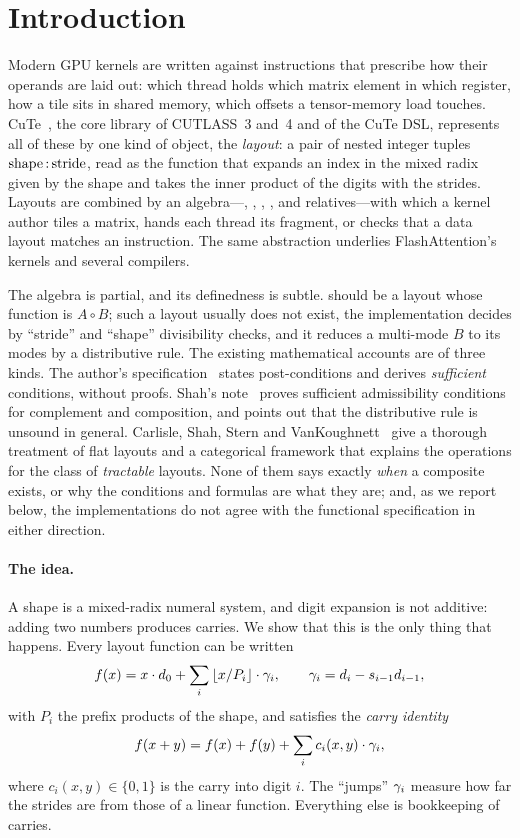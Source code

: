 \section{Introduction}

Modern GPU kernels are written against instructions that prescribe how their operands are laid out:
which thread holds which matrix element in which register, how a tile sits in shared memory,
which offsets a tensor-memory load touches. CuTe~\cite{cutedocs,cecka2026}, the core library of
CUTLASS~3 and~4 and of the CuTe DSL, represents all of these by one kind of object, the
\emph{layout}: a pair of nested integer tuples $\text{shape}\,{:}\,\text{stride}$, read as the
function that expands an index in the mixed radix given by the shape and takes the inner product
of the digits with the strides. Layouts are combined by an algebra---,
, , ,  and
relatives---with which a kernel author tiles a matrix, hands each thread its fragment, or checks
that a data layout matches an instruction. The same abstraction underlies
FlashAttention's kernels and several compilers.

The algebra is partial, and its definedness is subtle.  should be a layout
whose function is $A\circ B$; such a layout usually does not exist, the implementation decides
by ``stride'' and ``shape'' divisibility checks, and it reduces a multi-mode $B$ to its modes by a
distributive rule. The existing mathematical accounts are of three kinds. The author's
specification~\cite{cecka2026} states post-conditions and derives \emph{sufficient} conditions,
without proofs. Shah's note~\cite{shah2024} proves sufficient admissibility conditions for
complement and composition, and points out that the distributive rule is unsound in general.
Carlisle, Shah, Stern and VanKoughnett~\cite{carlisle2026} give a thorough treatment of flat
layouts and a categorical framework that explains the operations for the class of
\emph{tractable} layouts. None of them says exactly \emph{when} a composite exists, or why the
conditions and formulas are what they are; and, as we report below, the implementations do not
agree with the functional specification in either direction.

\paragraph{The idea.} A shape is a mixed-radix numeral system, and digit expansion is not additive:
adding two numbers produces carries. We show that this is the only thing that happens. Every
layout function can be written
\[ f(x)=x\cdot d_0+\sum_i\left\lfloor x/P_i \right\rfloor\cdot\gamma_i,\qquad \gamma_i=d_i-s_{i-1}d_{i-1}, \]
with $P_i$ the prefix products of the shape, and satisfies the \emph{carry identity}
\[ f(x+y)=f(x)+f(y)+\sum_i c_i(x,y)\cdot\gamma_i , \]
where $c_i(x,y)\in\{0,1\}$ is the carry into digit $i$. The ``jumps'' $\gamma_i$ measure how far the
strides are from those of a linear function. Everything else is bookkeeping of carries.

